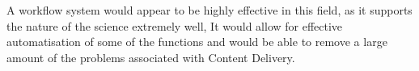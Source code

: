 \documentclass[11pt,twocolumn]{article}
\begin{document}
   A workflow system would appear to be highly effective in this
   field, as it supports the nature of the science extremely well,
   It would allow for effective automatisation of some of the
   functions and would be able to remove a large amount of the
   problems associated with Content Delivery.
   \cite{Withana:2010:VWE:1851476.1851586}




{}

\end{document}
